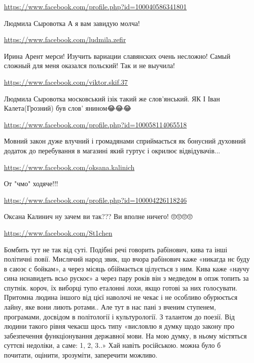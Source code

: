 \documentclass[a4paper,11pt]{extreport}
\begin{document}
\begin{itemize}
\begin{itemize}
\url{https://www.facebook.com/profile.php?id=100040586341801}

Людмила Сыровотка А я вам завидую молча!

\url{https://www.facebook.com/ludmila.zefir}

Ирина Арент мерси! Изучить вариации славянских очень несложно! Самый сложный для меня оказался польский! Так и не выучила!

\url{https://www.facebook.com/viktor.skif.37}

Людмила Сыровотка московський ізік такий же слов'янський. ЯК І Іван Калета(Грозний) був слов' янином😂😂😂

\end{itemize}
\url{https://www.facebook.com/profile.php?id=100058114065518}

Мовний закон дуже влучний і громадянами сприймається як бонусний духовний додаток до перебування в магазині який гуртує і окрилює відвідувачів...

\url{https://www.facebook.com/oksana.kalinich}

От "чмо" ходяче!!!

\begin{itemize}
\url{https://www.facebook.com/profile.php?id=100004226118246}

Оксана Калинич ну зачем ви так??? Ви вполне ничего! 🙄🙄🙄🙄

\end{itemize}
\url{https://www.facebook.com/St1chen}

Бомбить тут не так від суті. Подібні речі говорить рабінович, кива та інші політичні повії. Мислячий народ звик, що вчора рабінович каже «никагда нє буду в саюзє с бойкам», а через місяць обіймається цілується з ним. Кива каже «научу сина нєнавидеть всьо рускоє» а через пару років він з медведом в опзж топить за спутнік. короч, їх виборці тупо еталонні лохи, якщо готові за них голосувати. Притомна людина іншого від цієї наволочі не чекає і не особливо обурюється лайну, яке вони лиють ротами..
Але тут в нас пані з вченим ступенем, програмами, досвідом в політології і культурології. З талантом до поезії.
Від людини такого рівня чекаєш щось типу «висловлю я думку щодо закону про забезпечення функціонування державної мови. На мою думку, в ньому містяться суттєві недоліки, а саме: 1, 2, 3..»
Хай навіть російською. можна було б почитати, оцінити, зрозуміти, заперечити можливо.


\end{itemize}
\end{document}
